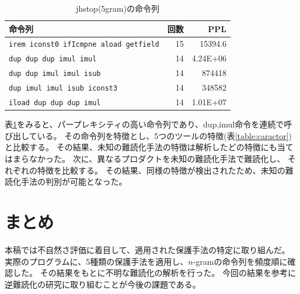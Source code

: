 \documentclass[a4j,fleqn,10pt]{jarticle}
\begin{document}
\begin{table}[t]
  \centering
  \footnotesize{
    \caption{jhstop(5gram)の命令列}\label{table:jhstop}
  \begin{tabular}{lrr}
    命令列 &
    \multicolumn{1}{p{1cm}}{回数} & 
    \multicolumn{1}{p{1cm}}{PPL} \\ \hline
    \texttt{irem iconst0 ifIcmpne aload getfield}     & 15 & 15394.6 \\
    \texttt{dup dup dup imul imul}                    & 14 & 4.24E+06 \\
    \texttt{dup dup imul imul isub}                   & 14 & 874418 \\
    \texttt{dup imul imul isub iconst3}               & 14 & 348582 \\
    \texttt{iload dup dup dup imul}                   & 14 & 1.01E+07 \\
    \end{tabular}}
\end{table}
表\ref{table:jhstop}をみると、パープレキシティの高い命令列であり、dup,imul命令を連続で呼び出している。
その命令列を特徴とし、5つのツールの特徴(表\ref{table:caractor})と比較する。
その結果、未知の難読化手法の特徴は解析したどの特徴にも当てはまらなかった。
次に、異なるプロダクトを未知の難読化手法で難読化し、
それぞれの特徴を比較する。
その結果、同様の特徴が検出されたため、未知の難読化手法の判別が可能となった。
 
 \section{まとめ}
 本稿では不自然さ評価に着目して、適用された保護手法の特定に取り組んだ。
実際のプログラムに、5種類の保護手法を適用し、$n$-gramの命令列を頻度順に確認した。
その結果をもとに不明な難読化の解析を行った。
今回の結果を参考に逆難読化の研究に取り組むことが今後の課題である。




\end{document}
